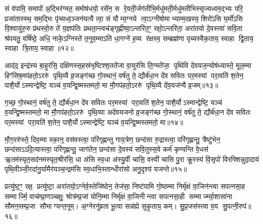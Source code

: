{\anuvakamend[{चक्षु॑र॒ष्टाच॑त्वारिशच्च। (7)}]}

सं व॑पामि॒ समापो॑ अ॒द्भिर॑ग्मत॒ समोष॑धयो॒ रसे॑न॒ स रे॒वती॒र्जग॑तीभि॒र्मधु॑मती॒र्मधु॑मतीभिस्सृज्यध्वम॒द्भ्यः परि॒ प्रजा॑तास्स्थ॒ सम॒द्भिः पृ॑च्यध्व॒ञ्जन॑यत्यै त्वा॒ सं यौम्य॒ग्नये त्वा॒ऽग्नीषोमाभ्याम्म॒खस्य॒ शिरो॑ऽसि घ॒र्मो॑ऽसि वि॒श्वायु॑रु॒रु प्र॑थस्वो॒रु ते॑ य॒ज्ञप॑तिः प्रथता॒न्त्वच॑ङ्गृह्णीष्वा॒ऽन्तरि॑त॒ꣳ॒ रक्षो॒ऽन्तरि॑ता॒ अरा॑तयो दे॒वस्त्वा॑ सवि॒ता श्र॑पयतु॒ वर्\mbox{}षि॑ष्ठे॒ अधि॒ नाके॒ऽग्निस्ते॑ त॒नुव॒म्माऽति॑ धा॒गग्ने॑ ह॒व्य र॑क्षस्व॒ सम्ब्रह्म॑णा पृच्यस्वैक॒ताय॒ स्वाहा द्वि॒ताय॒ स्वाहा त्रि॒ताय॒ स्वाहा॥१२॥

{\anuvakamend[{स॒वि॒ता द्वाविꣳ॑शतिश्च। (8)}]}

आद॑द॒ इन्द्र॑स्य बा॒हुर॑सि॒ दक्षि॑णस्स॒हस्र॑भृष्टिश्श॒तते॑जा वा॒युर॑सि ति॒ग्मते॑जा॒ पृथि॑वि देवयज॒न्योष॑ध्यास्ते॒ मूल॒म्मा हिꣳ॑सिष॒मप॑हतो॒ऽररु॑ पृथि॒व्यै व्र॒जङ्ग॑च्छ गो॒स्थानं॒ वर्\mbox{}ष॑तु ते॒ द्यौर्ब॑धा॒न दे॑व सवितः पर॒मस्यां परा॒वति॑ श॒तेन॒ पाशै॒र्योऽस्मान्द्वेष्टि॒ यञ्च॑ व॒यन्द्वि॒ष्मस्तमतो॒ मा मौ॒गप॑हतो॒ऽररु॑ पृथि॒व्यै दे॑व॒यज॑न्यै व्र॒जम्॥१३॥

ग॒च्छ॒ गो॒स्थानं॒ वर्\mbox{}ष॑तु ते॒ द्यौर्ब॑धा॒न दे॑व सवितः पर॒मस्यां परा॒वति॑ श॒तेन॒ पाशै॒र्योऽस्मान्द्वेष्टि॒ यञ्च॑ व॒यन्द्वि॒ष्मस्तमतो॒ मा मौ॒गप॑हतो॒ऽररु॑ पृथि॒व्या अदे॑वयजनो व्र॒जङ्ग॑च्छ गो॒स्थानं॒ वर्\mbox{}ष॑तु ते॒ द्यौर्ब॑धा॒न दे॑व सवितः पर॒मस्यां परा॒वति॑ श॒तेन॒ पाशै॒र्योऽस्मान्द्वेष्टि॒ यञ्च॑ व॒यन्द्वि॒ष्मस्तमतो॒ मा॥१४॥

मौ॒ग॒ररु॑स्ते॒ दिव॒म्मा स्का॒न्॒ वस॑वस्त्वा॒ परि॑गृह्णन्तु गाय॒त्रेण॒ छन्द॑सा रु॒द्रास्त्वा॒ परि॑गृह्णन्तु॒ त्रैष्टु॑भेन॒ छन्द॑साऽऽदि॒त्यास्त्वा॒ परि॑गृह्णन्तु॒ जाग॑तेन॒ छन्द॑सा दे॒वस्य॑ सवि॒तुस्स॒वे कर्म॑ कृण्वन्ति वे॒धस॑ ऋ॒तम॑स्यृत॒सद॑नमस्यृत॒श्रीर॑सि॒ धा अ॑सि स्व॒धा अ॑स्यु॒र्वी चासि॒ वस्वी॑ चासि पु॒रा क्रू॒रस्य॑ वि॒सृपो॑ विरफ्शिन्नुदा॒दाय॑ पृथि॒वीञ्जी॒रदा॑नु॒र्यामैर॑यञ्च॒न्द्रम॑सि स्व॒धाभि॒स्तान्धीरा॑सो अनु॒दृश्य॑ यजन्ते॥१५॥

{\anuvakamend[{दे॒व॒यज॑न्यै व्र॒जन्तमतो॒ मा वि॑रफ्शि॒न्नेका॑दश च। (9)}]}

प्रत्यु॑ष्ट॒ꣳ॒ रक्ष॒ प्रत्यु॑ष्टा॒ अरा॑तयो॒ऽग्नेर्व॒स्तेजि॑ष्ठेन॒ तेज॑सा॒ निष्ट॑पामि गो॒ष्ठम्मा निर्मृ॑क्षं वा॒जिन॑न्त्वा सपत्नसा॒ह सम्मार्ज्मि॒ वाच॑म्प्रा॒णञ्चक्षुः॒ श्रोत्र॑म्प्र॒जां योनि॒म्मा निर्मृ॑क्षं वा॒जिनीन्त्वा सपत्नसा॒ही सम्मार्ज्म्या॒शासा॑ना सौमन॒सम्प्र॒जा सौभाग्यन्त॒नूम्। अ॒ग्नेरनु॑व्रता भू॒त्वा सन्न॑ह्ये सुकृ॒ताय॒ कम्। सु॒प्र॒जस॑स्त्वा व॒य सु॒पत्नी॒रुप॑॥१६॥

